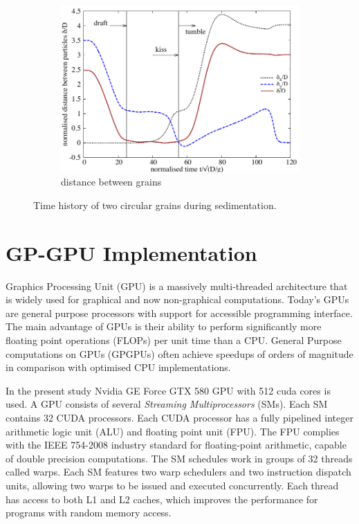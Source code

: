 \begin{figure}[tbhp]
\begin{subfigure}[b]{0.475\textwidth}
		\includegraphics[width=\textwidth]{Kissing_delta}
		\caption{distance between grains}
		\label{fig:kissdelta}
	\end{subfigure}
	\caption{Time history of two circular grains during sedimentation.}
	\label{fig:kiss}
\end{figure}

\section{GP-GPU Implementation}

Graphics Processing Unit (GPU) is a massively multi-threaded architecture that 
is widely used for graphical and now non-graphical computations. Today's GPUs 
are general purpose processors with support for accessible programming 
interface. The main advantage of GPUs is their ability to perform significantly 
more floating point operations (FLOPs) per unit time than a CPU. General 
Purpose computations on GPUs (GPGPUs) often achieve speedups of orders of 
magnitude in comparison with optimised CPU implementations. 

In the present study Nvidia GE Force GTX 580 GPU with 512 cuda cores is used. A 
GPU consists of several \emph{Streaming Multiprocessors} (SMs). Each SM 
contains 32 CUDA processors. Each CUDA processor has a fully pipelined integer 
arithmetic logic unit (ALU) and floating point unit (FPU). The FPU complies 
with the IEEE 754-2008 industry standard for floating-point arithmetic, capable 
of double precision computations. The SM schedules work in groups of 32 threads 
called warps. Each SM features two warp schedulers and two instruction dispatch 
units, allowing two warps to be issued and executed concurrently. Each thread 
has access to both L1 and L2 caches, which improves the performance for 
programs with random memory access.

